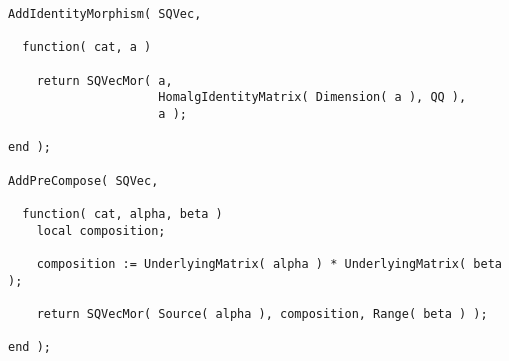 \begin{small}
\begin{Verbatim}[frame=single]
AddIdentityMorphism( SQVec,
                     
  function( cat, a )
    
    return SQVecMor( a,
                     HomalgIdentityMatrix( Dimension( a ), QQ ),
                     a );
    
end );

AddPreCompose( SQVec,

  function( cat, alpha, beta )
    local composition;

    composition := UnderlyingMatrix( alpha ) * UnderlyingMatrix( beta );

    return SQVecMor( Source( alpha ), composition, Range( beta ) );

end );
\end{Verbatim}
\end{small}